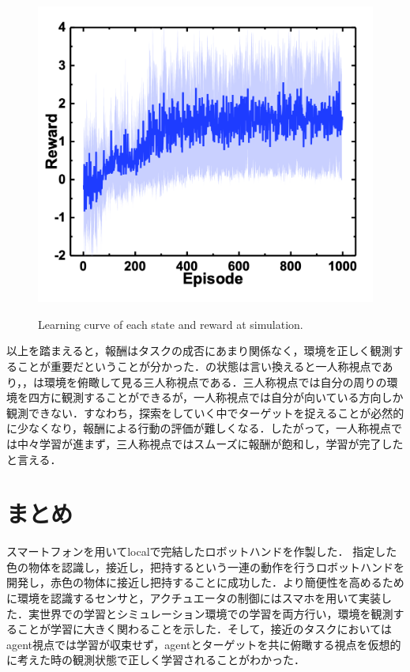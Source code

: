 \begin{figure}[H]
\begin{minipage}{0.4\linewidth}
        \label{fig:報酬距離}
    \end{minipage}
    \begin{minipage}{0.4\linewidth}
        \centering
        \includegraphics[width=0.9\linewidth]{figure/chapter3/QL_rew=redArea_obs=posvec_origin}
        \label{fig:報酬面積}
    \end{minipage}
    \caption{Learning curve of each state and reward at simulation.}
    \label{fig:シミュレーション結果}
\end{figure}

以上を踏まえると，報酬はタスクの成否にあまり関係なく，環境を正しく観測することが重要だということが分かった．の状態は言い換えると一人称視点であり，，は環境を俯瞰して見る三人称視点である．三人称視点では自分の周りの環境を四方に観測することができるが，一人称視点では自分が向いている方向しか観測できない．すなわち，探索をしていく中でターゲットを捉えることが必然的に少なくなり，報酬による行動の評価が難しくなる．したがって，一人称視点では中々学習が進まず，三人称視点ではスムーズに報酬が飽和し，学習が完了したと言える．


\section{まとめ}
スマートフォンを用いてlocalで完結したロボットハンドを作製した．
指定した色の物体を認識し，接近し，把持するという一連の動作を行うロボットハンドを開発し，赤色の物体に接近し把持することに成功した．より簡便性を高めるために環境を認識するセンサと，アクチュエータの制御にはスマホを用いて実装した．実世界での学習とシミュレーション環境での学習を両方行い，環境を観測することが学習に大きく関わることを示した．そして，接近のタスクにおいてはagent視点では学習が収束せず，agentとターゲットを共に俯瞰する視点を仮想的に考えた時の観測状態で正しく学習されることがわかった．

